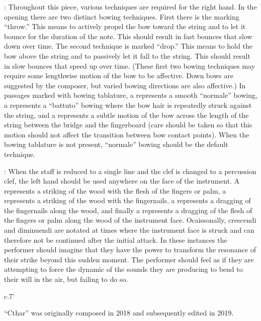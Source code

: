 \documentclass[10pt]{article}
\newcommand*\circled[1]{\tikz[baseline=(char.base)]{
            \node[shape=circle,draw,inner sep=1pt] (char) {#1};}}
\begin{document}
\begingroup
\begin{center}
: Throughout this piece, various techniques are required for the right hand. In the opening there are two distinct bowing techniques. \circled{1} First there is the marking ``throw.'' This means to actively propel the bow toward the string and to let it bounce for the duration of the note. This should result in fast bounces that slow down over time. \circled{2} The second technique is marked ``drop.'' This means to hold the bow above the string and to passively let it fall to the string. This should result in slow bounces that speed up over time. (These first two bowing techniques may require some lengthwise motion of the bow to be affective. Down bows are suggested by the composer, but varied bowing directions are also affective.) \circled{3} In passages marked with bowing tablature, a  represents a smooth ``normale'' bowing, a  represents a ``battuto'' bowing where the bow hair is repeatedly struck against the string, and a  represents a subtle motion of the bow across the length of the string between the bridge and the fingerboard (care should be taken so that this motion should not affect the transition between bow contact points). When the bowing tablature is not present, ``normale'' bowing should be the default technique.
\rightskip\leftskip
\phantom{text} \hfill \phantom{()}
\end{center}
\endgroup

\vspace*{0.2\baselineskip}

\begingroup
\begin{center}
: When the staff is reduced to a single line and the clef is changed to a percussion clef, the left hand should be used anywhere on the face of the instrument. A  represents a striking of the wood with the flesh of the fingers or palm, a  represents a striking of the wood with the fingernails, a  represents a dragging of the fingernails along the wood, and finally a  represents a dragging of the flesh of the fingers or palm along the wood of the instrument face. Ocaissonally,  crescendi and diminuendi are notated at times where the instrument face is struck and can therefore not be continued after the initial attack. In these instances the performer should imagine that they have the power to transform the resonance of their strike beyond this sudden moment. The performer should feel as if they are attempting to force the dynamic of the sounds they are producing to bend to their will in the air, but failing to do so.
\rightskip\leftskip
\phantom{text} \hfill \phantom{()}
\end{center}
\endgroup

\vspace*{4\baselineskip}

\begin{center}
c.7'
\end{center}

\vspace*{4\baselineskip}

\begin{center}
``Cthar'' was originally composed in 2018 and subsequently edited in 2019.
\end{center}

\vspace*{4\baselineskip}
\end{document}
